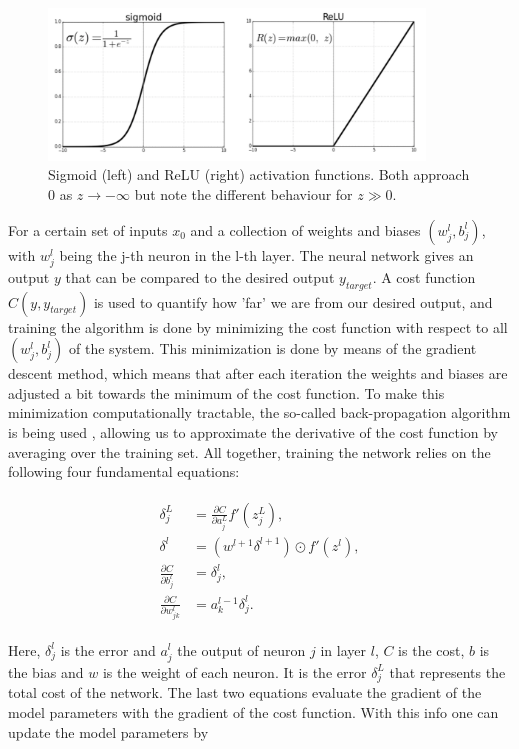 \begin{figure}[H]
    \centering
    \includegraphics[width=100mm]{plots/f(z).png}
    \caption{Sigmoid (left) and ReLU (right) activation functions. Both approach 0 as $z\rightarrow -\infty$ but note the different behaviour for $z\gg0$. }
    \label{activation}
\end{figure}


For a certain set of inputs \textbf{$x_0$} and a collection of weights and biases $(w^l_j,b^l_j)$, 
with $w^l_j$ being the j-th neuron in the l-th layer.
%
The neural network gives an output $y$ that can be compared to the desired output $y_{target}$. 
%
A cost function $C(y, y_{target})$ is used to quantify how 'far' we are from our desired output, 
and training the algorithm is done by minimizing the cost function with respect to all $(w^l_j,b^l_j)$ of the system. 
%
This minimization is done by means of the gradient descent method, which means 
that after each iteration the weights and biases are adjusted a bit towards 
the minimum of the cost function. 
%
To make this minimization computationally tractable, 
the so-called back-propagation algorithm is being used \cite{hn}, 
allowing us to approximate the derivative of the cost function by averaging over the training set. 
%
All together, training the network relies on the following four fundamental equations:

\begin{align}
\label{eqs3}
\begin{split}
 \delta_j^L &= \frac{\partial C}{\partial a_j^L} f'(z_j^L), 
 \\
 \delta^l &= (w^{l+1} \delta^{l+1}) \odot f'(z^l),
 \\
 \frac{\partial C}{\partial b_j^l} &= \delta_j^l,
 \\
 \frac{\partial C}{\partial w_{jk}^l} &= a_k^{l-1}\delta_j^l.
\end{split}
\end{align}

Here, $\delta_j^l$ is the error and $a_j^l$ the output of neuron $j$ in layer $l$, 
$C$ is the cost, $b$ is the bias and $w$ is the weight of each neuron. 
%
It is the error $\delta_j^L$ that represents the total cost of the network.
%
The last two equations evaluate the gradient of the model parameters 
with the gradient of the cost function. 
%
With this info one can update the model parameters by

